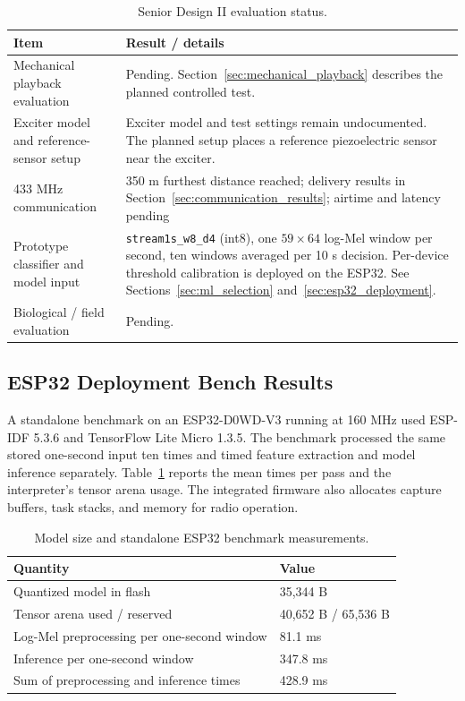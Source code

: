 \documentclass[12pt,a4paper,oneside]{memoir}
\newcommand{\newrevision}[1]{#1}
\begin{document}
\begin{table}[htbp]
\centering
\caption{\newrevision{Senior Design II evaluation status.}}
\begin{tabular}{p{}p{}}
\toprule
Item & Result / details \\
\midrule
\newrevision{Mechanical playback evaluation} & \newrevision{Pending. Section~\ref{sec:mechanical_playback} describes the planned controlled test.} \\
\newrevision{Exciter model and reference-sensor setup} & \newrevision{Exciter model and test settings remain undocumented. The planned setup places a reference piezoelectric sensor near the exciter.} \\
433 MHz communication & 350 m furthest distance reached; delivery results in Section~\ref{sec:communication_results}; airtime and latency pending \\
\newrevision{Prototype classifier and model input} & \newrevision{\texttt{stream1s\_w8\_d4} (int8), one $59 \times 64$ log-Mel window per second, ten windows averaged per 10 s decision. Per-device threshold calibration is deployed on the ESP32. See Sections~\ref{sec:ml_selection} and~\ref{sec:esp32_deployment}.} \\
\newrevision{Biological / field evaluation} & \newrevision{Pending.} \\
\bottomrule
\end{tabular}
\end{table}

\FloatBarrier

\subsection{\newrevision{ESP32 Deployment Bench Results}}
\label{sec:esp32_bench_results}

\newrevision{A standalone benchmark on an ESP32-D0WD-V3 running at 160 MHz used ESP-IDF 5.3.6 and TensorFlow Lite Micro 1.3.5. The benchmark processed the same stored one-second input ten times and timed feature extraction and model inference separately. Table~\ref{tab:esp32_bench} reports the mean times per pass and the interpreter's tensor arena usage. The integrated firmware also allocates capture buffers, task stacks, and memory for radio operation.}

\begin{table}[htbp]
\centering
\caption{\newrevision{Model size and standalone ESP32 benchmark measurements.}}
\label{tab:esp32_bench}
\begingroup
\color{black}
\begin{tabular}{@{}ll@{}}
\toprule
Quantity & Value \\
\midrule
Quantized model in flash & 35,344 B \\
Tensor arena used / reserved & 40,652 B / 65,536 B \\
Log-Mel preprocessing per one-second window & 81.1 ms \\
Inference per one-second window & 347.8 ms \\
Sum of preprocessing and inference times & 428.9 ms \\
\bottomrule
\end{tabular}
\endgroup
\end{table}
\end{document}
